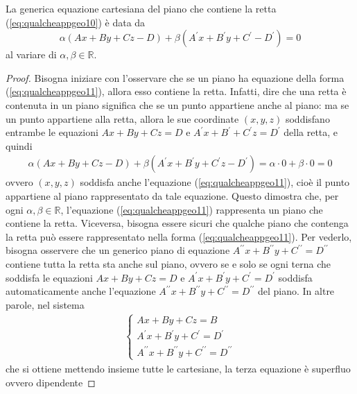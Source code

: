 \begin{prop}
  \label{prop:qualcheappgeo4}
  La generica equazione cartesiana del piano che contiene la retta (\ref{eq:qualcheappgeo10}) è data
  da
  \begin{equation}
    \label{eq:qualcheappgeo11}
    \alpha (Ax+By+Cz-D)+\beta (A^\prime x +B^\prime y + C^\prime-D^\prime)=0
  \end{equation}
  al variare di $\alpha,\beta\in \mathds{R}$.
\end{prop}
\begin{proof}
  Bisogna iniziare con l'osservare che se un piano ha equazione della forma (\ref{eq:qualcheappgeo11}),
  allora esso contiene la retta. Infatti, dire che una retta è contenuta in un piano significa che se
  un punto appartiene anche al piano: ma se un punto appartiene alla retta, allora le sue coordinate
  $(x,y,z)$ soddisfano entrambe le equazioni $Ax+By+Cz=D$ e $A^\prime x+B^\prime+C^\prime z=D^\prime$ della
  retta, e quindi
  \begin{eqnarray*}
    \alpha(Ax+By+Cz-D)+\beta(A^\prime x+B^\prime y+C^\prime z-D^\prime) = \alpha \cdot 0+\beta \cdot 0=0
  \end{eqnarray*}
  ovvero $(x,y,z)$ soddisfa anche l'equazione (\ref{eq:qualcheappgeo11}), cioè il punto appartiene al
  piano rappresentato da tale equazione. Questo dimostra che, per ogni $\alpha, \beta\in \mathds{R}$,
  l'equazione (\ref{eq:qualcheappgeo11}) rappresenta un piano che contiene la retta.
  Viceversa, bisogna essere sicuri che qualche piano che contenga la retta può essere rappresentato
  nella forma (\ref{eq:qualcheappgeo11}). Per vederlo, bisogna osservere che un generico piano di
  equazione $A^{\prime\prime}x+B^{\prime\prime}y+C^{\prime\prime}=D^{\prime\prime}$ contiene tutta la
  retta sta anche sul piano, ovvero se e solo se ogni terna che soddisfa le equazioni
  $Ax+By+Cz=D$ e $A^{\prime}x+B^{\prime}y+C^{\prime}=D^{\prime}$ soddisfa automaticamente anche
  l'equazione $A^{\prime\prime}x+B^{\prime\prime}y+C^{\prime\prime}=D^{\prime\prime}$ del piano.
  In altre parole, nel sistema
  \begin{eqnarray*}
    \begin{cases}
      Ax+By+Cz=B\\
      A^{\prime}x+B^{\prime}y+C^{\prime}=D^{\prime}\\
      A^{\prime\prime}x+B^{\prime\prime}y+C^{\prime\prime}=D^{\prime\prime}
    \end{cases}
  \end{eqnarray*}
  che si ottiene mettendo insieme tutte le cartesiane, la terza equazione è superfluo ovvero dipendente

\end{proof}
